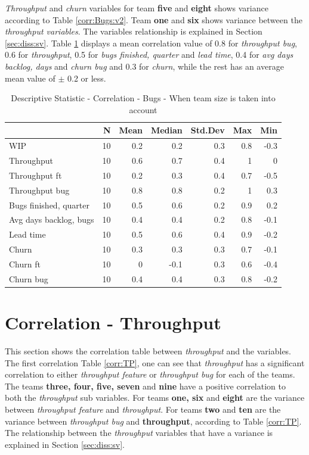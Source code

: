 \documentclass[UKenglish]{ifimaster}  %
\begin{document}
\textit{Throughput} and \textit{churn} variables for team \textbf{five} and \textbf{eight} shows variance according to Table \ref{corr:Bugs:v2}.  Team \textbf{one} and \textbf{six} shows variance between the \textit{throughput variables}. The variables relationship is explained in Section \ref{sec:diss:sv}. Table \ref{DS:corr:Bugs:v2} displays a mean correlation value of 0.8  for \textit{throughput bug}, 0.6 for \textit{throughput}, 0.5 for \textit{bugs finished, quarter} and \textit{lead time}, 0.4 for \textit{avg days backlog, days} and \textit{churn bug} and 0.3 for \textit{churn}, while the rest has an average mean value of $\pm$ 0.2 or less.

\FloatBarrier
\begin{table}[H]
 \centering
 \begin{tabular}{ | l | r | r | r | r | r | r | }
 \hline
& \bf{N} & \bf{Mean} & \bf{Median} & \bf{Std.Dev} & \bf{Max} & \bf{Min} \\ \hline
WIP  & 10 & 0.2 & 0.2 & 0.3 & 0.8 & -0.3\\ \hline
Throughput  & 10 & 0.6 & 0.7 & 0.4 & 1 & 0\\ \hline
Throughput ft  & 10 & 0.2 & 0.3 & 0.4 & 0.7 & -0.5\\ \hline
Throughput bug  & 10 & 0.8 & 0.8 & 0.2 & 1 & 0.3\\ \hline
Bugs finished, quarter  & 10 & 0.5 & 0.6 & 0.2 & 0.9 & 0.2\\ \hline
Avg days backlog, bugs  & 10 & 0.4 & 0.4 & 0.2 & 0.8 & -0.1\\ \hline
Lead time & 10 & 0.5 & 0.6 & 0.4 & 0.9 & -0.2\\ \hline
Churn  & 10 & 0.3 & 0.3 & 0.3 & 0.7 & -0.1\\ \hline
Churn ft  & 10 & 0 & -0.1 & 0.3 & 0.6 & -0.4\\ \hline
Churn bug  & 10 & 0.4 & 0.4 & 0.3 & 0.8 & -0.2\\ \hline
\end{tabular}
 \caption{Descriptive Statistic - Correlation - Bugs - When team size is taken into account}
 \label{DS:corr:Bugs:v2}
 \end{table}


\section {Correlation - Throughput}
\label{sec:corr:TP}
This section shows the correlation table between \textit{throughput} and the variables. The first correlation Table \ref{corr:TP}, one can see that \textit{throughput} has a significant correlation to either \textit{throughput feature} or \textit{throughput bug} for each of the teams. The teams \textbf{three, four, five, seven} and \textbf{nine} have a positive correlation to both the \textit{throughput} sub variables. For teams \textbf{one, six} and \textbf{eight} are the variance between \textit{throughput feature} and \textit{throughput}.  For teams \textbf{two} and \textbf{ten} are the variance between \textit{throughput bug} and \textbf{throughput}, according to Table \ref{corr:TP}. The relationship between the \textit{throughput} variables that have a variance is explained in Section \ref{sec:diss:sv}.
\end{document}
